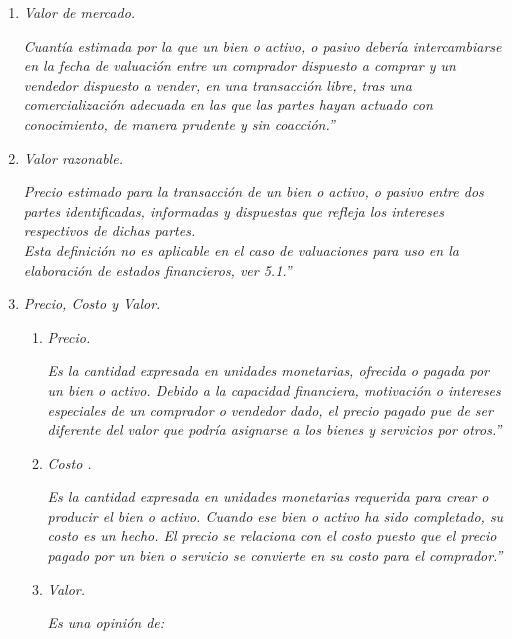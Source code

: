 
\begin{enumerate}
\item \textcolor{principal}{\textit{Valor de mercado. }}

\textit{Cuant\'ia estimada por la que un bien o activo, o pasivo deber\'ia intercambiarse en la fecha de valuaci\'on entre un comprador dispuesto a comprar y un vendedor dispuesto a vender, en una transacci\'on libre, tras una comercializaci\'on adecuada en las que las partes hayan actuado con conocimiento, de manera prudente y sin coacci\'on.''}

\item \textcolor{principal}{\textit{Valor razonable.} }

\textit{Precio estimado para la transacci\'on de un bien o activo, o pasivo entre dos partes identificadas, informadas y dispuestas que refleja los intereses respectivos de dichas partes. }\\

\textit{Esta definici\'on no es aplicable en el caso de valuaciones para uso en la elaboraci\'on de estados financieros, ver 5.1.''}

\item  \textcolor{principal}{\textit{Precio, Costo y Valor. }}

\begin{enumerate}
\item \textcolor{principal}{\textit{Precio. }}

\textit{Es la cantidad expresada en unidades monetarias, ofrecida o pagada por un bien o activo. Debido a la capacidad financiera, motivaci\'on o intereses especiales de un comprador o vendedor dado, el precio pagado pue de ser diferente del valor que podr\'ia asignarse a los bienes y servicios por otros.''}

\item  \textcolor{principal}{\textit{Costo .}}

\textit{Es la cantidad expresada en unidades monetarias requerida para crear o producir el bien o activo. Cuando ese bien o activo ha sido completado, su costo es un hecho. El precio se relaciona con el costo puesto que el precio pagado por un bien o servicio se convierte en su costo para el comprador.''}

\item \textcolor{principal}{ \textit{Valor. }}

\textit{Es una opini\'on de: }
\begin{enumerate}


\end{enumerate}
\end{enumerate}
\end{enumerate}
